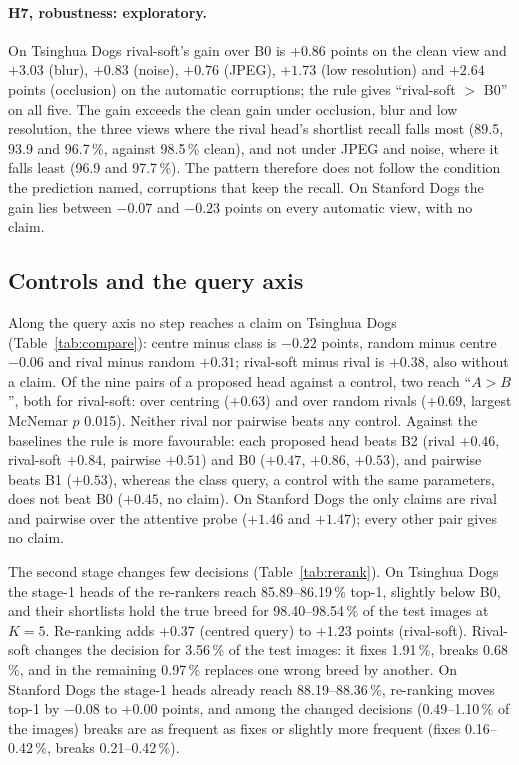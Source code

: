 \documentclass[11pt,a4paper]{article}
\theoremstyle{plain}
\begin{document}
\paragraph{H7, robustness: exploratory.}
On Tsinghua Dogs rival-soft's gain over B0 is $+0.86$ points on the clean view and $+3.03$ (blur), $+0.83$ (noise),
$+0.76$ (JPEG), $+1.73$ (low resolution) and $+2.64$ points (occlusion) on the automatic corruptions; the rule gives
``rival-soft $>$ B0'' on all five. The gain exceeds the clean gain under occlusion, blur and low resolution, the
three views where the rival head's shortlist recall falls most (89.5, 93.9 and 96.7\,\%, against 98.5\,\% clean),
and not under JPEG and noise, where it falls least (96.9 and 97.7\,\%). The pattern therefore does not follow the
condition the prediction named, corruptions that keep the recall. On Stanford Dogs the gain lies between $-0.07$ and
$-0.23$ points on every automatic view, with no claim.

\subsection{Controls and the query axis}\label{sec:res-controls}
Along the query axis no step reaches a claim on Tsinghua Dogs (Table~\ref{tab:compare}): centre minus class is
$-0.22$ points, random minus centre $-0.06$ and rival minus random $+0.31$; rival-soft minus rival is $+0.38$, also
without a claim. Of the nine pairs of a proposed head against a control, two reach ``$A>B$'', both for rival-soft:
over centring ($+0.63$) and over random rivals ($+0.69$, largest McNemar $p$ 0.015). Neither rival nor pairwise beats
any control. Against the baselines the rule is more favourable: each proposed head beats B2 (rival $+0.46$, rival-soft
$+0.84$, pairwise $+0.51$) and B0 ($+0.47$, $+0.86$, $+0.53$), and pairwise beats B1 ($+0.53$), whereas the class
query, a control with the same parameters, does not beat B0 ($+0.45$, no claim). On Stanford Dogs the only claims are
rival and pairwise over the attentive probe ($+1.46$ and $+1.47$); every other pair gives no claim.

The second stage changes few decisions (Table~\ref{tab:rerank}). On Tsinghua Dogs the stage-1 heads of the
re-rankers reach 85.89--86.19\,\% top-1, slightly below B0, and their shortlists hold the true breed for
98.40--98.54\,\% of the test images at $K=5$. Re-ranking adds $+0.37$ (centred query) to $+1.23$ points
(rival-soft). Rival-soft changes the decision for 3.56\,\% of the test images: it fixes 1.91\,\%, breaks 0.68\,\%, and
in the remaining 0.97\,\% replaces one wrong breed by another. On Stanford Dogs the stage-1 heads already reach
88.19--88.36\,\%, re-ranking moves top-1 by $-0.08$ to $+0.00$ points, and among the changed decisions
(0.49--1.10\,\% of the images) breaks are as frequent as fixes or slightly more frequent (fixes 0.16--0.42\,\%, breaks
0.21--0.42\,\%).
\end{document}

